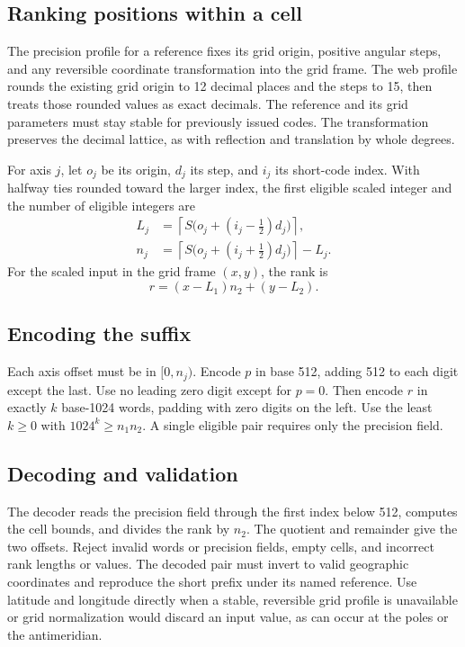 \documentclass[conference]{IEEEtran}
\begin{document}
\subsection{Ranking positions within a cell}
The precision profile for a reference fixes its grid origin, positive angular steps, and any reversible coordinate transformation into the grid frame. The web profile rounds the existing grid origin to 12 decimal places and the steps to 15, then treats those rounded values as exact decimals. The reference and its grid parameters must stay stable for previously issued codes. The transformation preserves the decimal lattice, as with reflection and translation by whole degrees.

For axis $j$, let $o_j$ be its origin, $d_j$ its step, and $i_j$ its short-code index. With halfway ties rounded toward the larger index, the first eligible scaled integer and the number of eligible integers are
\begin{align}
L_j &= \left\lceil S\bigl(o_j+(i_j-\tfrac12)d_j\bigr)\right\rceil,\\
n_j &= \left\lceil S\bigl(o_j+(i_j+\tfrac12)d_j\bigr)\right\rceil-L_j.
\end{align}
For the scaled input in the grid frame $(x,y)$, the rank is
\begin{equation}
r=(x-L_1)n_2+(y-L_2).
\end{equation}

\newpage
\subsection{Encoding the suffix}
Each axis offset must be in $[0,n_j)$. Encode $p$ in base 512, adding 512 to each digit except the last. Use no leading zero digit except for $p=0$. Then encode $r$ in exactly $k$ base-1024 words, padding with zero digits on the left. Use the least $k\ge0$ with $1024^k\ge n_1n_2$. A single eligible pair requires only the precision field.

\subsection{Decoding and validation}
The decoder reads the precision field through the first index below 512, computes the cell bounds, and divides the rank by $n_2$. The quotient and remainder give the two offsets. Reject invalid words or precision fields, empty cells, and incorrect rank lengths or values. The decoded pair must invert to valid geographic coordinates and reproduce the short prefix under its named reference. Use latitude and longitude directly when a stable, reversible grid profile is unavailable or grid normalization would discard an input value, as can occur at the poles or the antimeridian.
\end{document}
